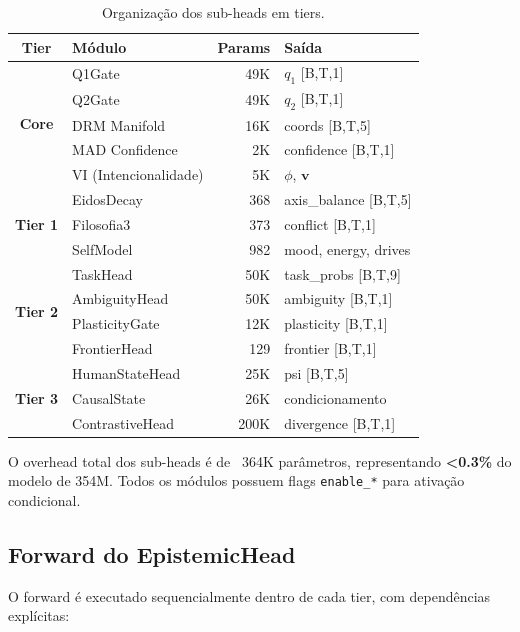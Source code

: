 \begin{table}[H]
\centering
\caption{Organiza\c{c}\~ao dos sub-heads em tiers.}
\label{tab:tiers}
\begin{tabular}{clrl}
\toprule
\textbf{Tier} & \textbf{M\'odulo} & \textbf{Params} & \textbf{Sa\'ida} \\
\midrule
\multirow{5}{*}{\textbf{Core}} & Q1Gate & ~49K & $q_1$ [B,T,1] \\
& Q2Gate & ~49K & $q_2$ [B,T,1] \\
& DRM Manifold & ~16K & coords [B,T,5] \\
& MAD Confidence & ~2K & confidence [B,T,1] \\
& VI (Intencionalidade) & ~5K & $\phi$, $\bm{v}$ \\
\midrule
\multirow{3}{*}{\textbf{Tier 1}} & EidosDecay & ~368 & axis\_balance [B,T,5] \\
& Filosofia3 & ~373 & conflict [B,T,1] \\
& SelfModel & ~982 & mood, energy, drives \\
\midrule
\multirow{4}{*}{\textbf{Tier 2}} & TaskHead & ~50K & task\_probs [B,T,9] \\
& AmbiguityHead & ~50K & ambiguity [B,T,1] \\
& PlasticityGate & ~12K & plasticity [B,T,1] \\
& FrontierHead & ~129 & frontier [B,T,1] \\
\midrule
\multirow{3}{*}{\textbf{Tier 3}} & HumanStateHead & ~25K & psi [B,T,5] \\
& CausalState & ~26K & condicionamento \\
& ContrastiveHead & ~200K & divergence [B,T,1] \\
\bottomrule
\end{tabular}
\end{table}

O overhead total dos sub-heads \'e de ~364K par\^ametros, representando
\textbf{<0.3\%} do modelo de 354M. Todos os m\'odulos possuem flags
\texttt{enable\_*} para ativa\c{c}\~ao condicional.

\subsection{Forward do EpistemicHead}

O forward \'e executado sequencialmente dentro de cada tier, com
depend\^encias expl\'icitas:

